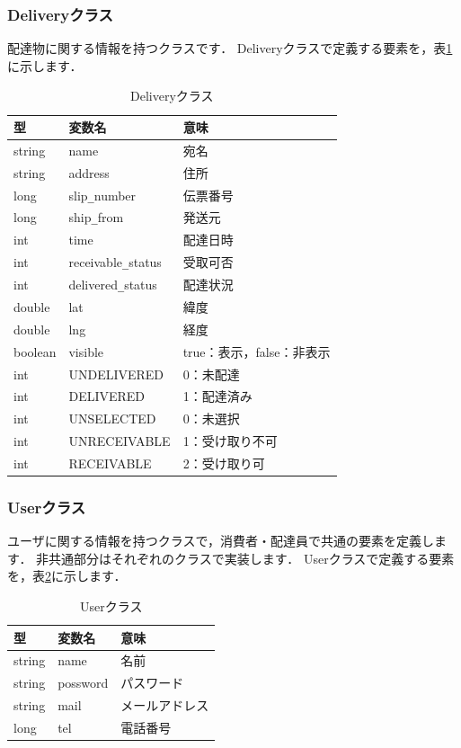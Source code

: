 \documentclass[a4j,titlepage]{jarticle}
\begin{document}
\subsubsection{Deliveryクラス}
配達物に関する情報を持つクラスです．
Deliveryクラスで定義する要素を，表\ref{deliveryTable}に示します．\\
\begin{table}[htb]
\centering
\caption{Deliveryクラス}
\label{deliveryTable}
\begin{tabular}{|lll|}
\hline
型 & 変数名 & 意味      \\ \hline
string  & name  & 宛名     \\
string & address &  住所    \\
long  &  slip\verb|_|number  &  伝票番号  \\
long & ship\verb|_|from &  発送元    \\
int & time &  配達日時    \\
int & receivable\verb|_|status &  受取可否   \\
int & delivered\verb|_|status  &  配達状況  \\
double & lat & 緯度 \\
double & lng & 経度 \\
boolean & visible  &  true：表示，false：非表示    \\
int & UNDELIVERED  & 0：未配達   \\
int & DELIVERED  &  1：配達済み  \\
int & UNSELECTED  &  0：未選択  \\
int & UNRECEIVABLE  & 1：受け取り不可   \\
int & RECEIVABLE  & 2：受け取り可   \\\hline
\end{tabular}
\end{table}
\clearpage

\subsubsection{Userクラス}
ユーザに関する情報を持つクラスで，消費者・配達員で共通の要素を定義します．
非共通部分はそれぞれのクラスで実装します．
Userクラスで定義する要素を，表\ref{userTable}に示します．\\
\begin{table}[htb]
\centering
\caption{Userクラス}
\label{userTable}
\begin{tabular}{|lll|}
\hline
型 & 変数名 & 意味      \\ \hline
string  & name  & 名前     \\
string & possword & パスワード     \\
string & mail & メールアドレス     \\
long & tel & 電話番号     \\\hline
\end{tabular}
\end{table}
\end{document}
